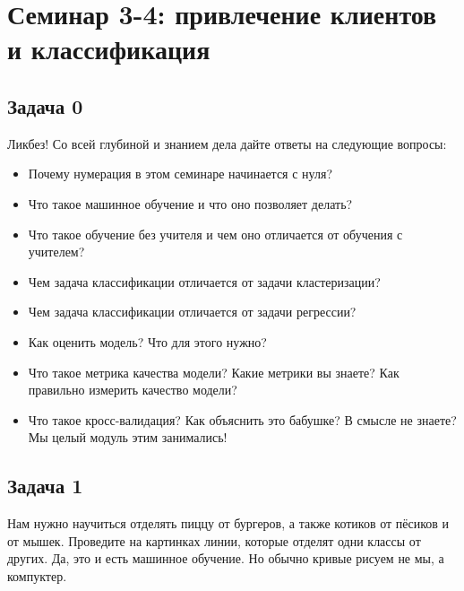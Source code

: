 \documentclass[12pt, a4paper, oneside]{article}
\begin{document}
\section*{Семинар 3-4:  привлечение клиентов и классификация}

\subsection*{Задача 0}

Ликбез!  Со всей глубиной и знанием дела дайте ответы на следующие вопросы: 

\begin{itemize}
\item  Почему нумерация в этом семинаре начинается с нуля? 
\item  Что такое машинное обучение и что оно позволяет делать? 
\item  Что такое обучение без учителя и чем оно отличается от обучения с учителем? 
\item  Чем задача классификации отличается от задачи кластеризации? 
\item  Чем задача классификации отличается от задачи регрессии? 
\item  Как оценить модель? Что для этого нужно? 
\item Что такое метрика качества модели? Какие метрики вы знаете? Как правильно измерить качество модели? 
\item Что такое кросс-валидация?  Как объяснить это бабушке?  В смысле не знаете? Мы целый модуль этим занимались! 
\end{itemize}

\subsection*{Задача 1}

Нам нужно научиться отделять пиццу от бургеров, а также котиков от пёсиков и от мышек. Проведите на картинках линии, которые отделят одни классы от других.  Да, это и есть машинное обучение. Но обычно кривые рисуем не мы, а компуктер.
\end{document}
